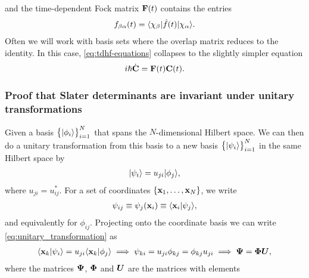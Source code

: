         and the time-dependent Fock matrix $\mathbf{F}(t)$ contains the entries
        \begin{align}
            f_{\beta\alpha}(t) = \langle \chi_{\beta} |\hat{f}(t)| \chi_\alpha \rangle.
        \end{align}
        Often we will work with basis sets where the overlap matrix reduces to
        the identity. In this case, \autoref{eq:tdhf-equations} collapses to the
        slightly simpler equation
        \begin{align}
            i\hslash \dot{\mathbf{C}} = \mathbf{F}(t)\mathbf{C}(t).
            \label{eq:tdhf-orthogonal}
        \end{align}


        \subsubsection{Proof that Slater determinants are invariant under
        unitary transformations}
            \label{ssub:slater_determinants_invariant}
            Given a basis $\left\{ | \phi_i \rangle \right\}_{i = 1}^{N}$ that spans the
            $N$-dimensional Hilbert space. We can then do a unitary
            transformation from this basis to a new basis
            $\left\{ | \psi_i \rangle \right\}_{i = 1}^{N}$ in the same Hilbert space by
            \begin{align}
                | \psi_i \rangle = u_{ji}| \phi_j \rangle,
                \label{eq:unitary_transformation}
            \end{align}
            where $u_{ji} = u_{ij}^{*}$. For a set of coordinates
            $\left\{ \mathbf{x}_1, \dots, \mathbf{x}_N \right\}$, we write
            \begin{align}
                \psi_{ij} \equiv \psi_j(\mathbf{x}_i)
                \equiv \langle \mathbf{x}_i | \psi_j \rangle,
            \end{align}
            and equivalently for $\phi_{ij}$. Projecting onto the coordinate
            basis we can write \autoref{eq:unitary_transformation} as
            \begin{gather}
                \langle \mathbf{x}_k | \psi_i \rangle
                = u_{ji}\langle \mathbf{x}_k | \phi_j \rangle
                \implies
                \psi_{ki} = u_{ji}\phi_{kj} = \phi_{kj}u_{ji}
                \implies \boldsymbol{\Psi} = \boldsymbol{\Phi}\boldsymbol{U},
            \end{gather}
            where the matrices $\boldsymbol{\Psi}$, $\boldsymbol{\Phi}$ and $\boldsymbol{U}$ are
            the matrices with elements
